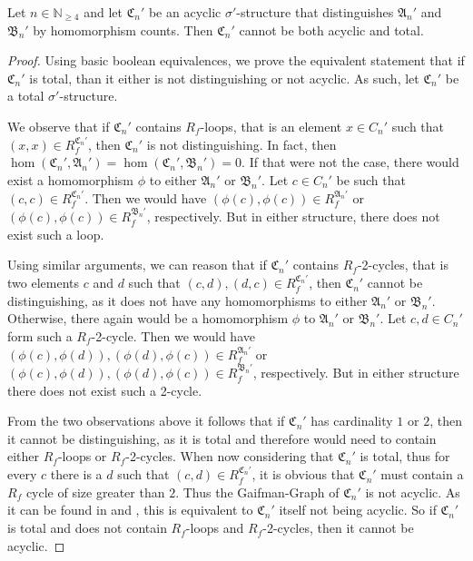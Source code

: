 \begin{lemma}
	Let $n\in\mathbb N_{\geq 4}$ and let $\mathfrak C_n'$ be an acyclic $\sigma'$-structure that distinguishes $\mathfrak A_n'$ and $\mathfrak B_n'$ by homomorphism counts.
	Then $\mathfrak C_n'$ cannot be both acyclic and total.
	\label{lem:totalityNotEnforcable}
\end{lemma}
\begin{proof}
	Using basic boolean equivalences, we prove the equivalent statement that if $\mathfrak C_n'$ is total, than it either is not distinguishing or not acyclic.
	As such, let $\mathfrak C_n'$ be a total $\sigma'$-structure.
	
	We observe that if $\mathfrak C_n'$ contains $R_f$-loops, that is an element $x\in C_n'$ such that $(x, x)\in R_f^{\mathfrak C_n'}$, then $\mathfrak C_n'$ is not distinguishing.
	In fact, then $\hom(\mathfrak C_n',\mathfrak A_n')=\hom(\mathfrak C_n',\mathfrak B_n')=0$.
	If that were not the case, there would exist a homomorphism $\phi$ to either $\mathfrak A_n'$ or $\mathfrak B_n'$.
	Let $c\in C_n'$ be such that $(c,c)\in R_f^{\mathfrak C_n'}$.
	Then we would have $(\phi(c),\phi(c))\in R_f^{\mathfrak A_n'}$ or $(\phi(c),\phi(c))\in R_f^{\mathfrak B_n'}$, respectively.
	But in either structure, there does not exist such a loop.
	
	Using similar arguments, we can reason that if $\mathfrak C_n'$ contains $R_f$-2-cycles, that is two elements $c$ and $d$ such that $(c, d), (d, c)\in R_f^{\mathfrak C_n'}$, then $\mathfrak C_n'$ cannot be distinguishing, as it does not have any homomorphisms to either $\mathfrak A_n'$ or $\mathfrak B_n'$.
	Otherwise, there again would be a homomorphism $\phi$ to $\mathfrak A_n'$ or $\mathfrak B_n'$.
	Let $c,d\in C_n'$ form such a $R_f$-2-cycle.
	Then we would have $(\phi(c),\phi(d)),(\phi(d),\phi(c))\in R_f^{\mathfrak A_n'}$ or $(\phi(c),\phi(d)),(\phi(d),\phi(c))\in R_f^{\mathfrak B_n'}$, respectively.
	But in either structure there does not exist such a 2-cycle.
	
	From the two observations above it follows that if $\mathfrak C_n'$ has cardinality $1$ or $2$, then it cannot be distinguishing, as it is total and therefore would need to contain either $R_f$-loops or $R_f$-2-cycles.
	When now considering that $\mathfrak C_n'$ is total, thus for every $c$ there is a $d$ such that $(c,d)\in R_f^{\mathfrak C_n'}$, it is obvious that $\mathfrak C_n'$ must contain a $R_f$ cycle of size greater than $2$.
	Thus the Gaifman-Graph of $\mathfrak C_n'$ is not acyclic. 
	As it can be found in \cite{brault-baron2014HypergraphAcyclicity} and \cite{scheidt2025ColorRefinement}, this is equivalent to $\mathfrak C_n'$ itself not being acyclic.
	So if $\mathfrak C_n'$ is total and does not contain $R_f$-loops and $R_f$-2-cycles, then it cannot be acyclic.
\end{proof}

